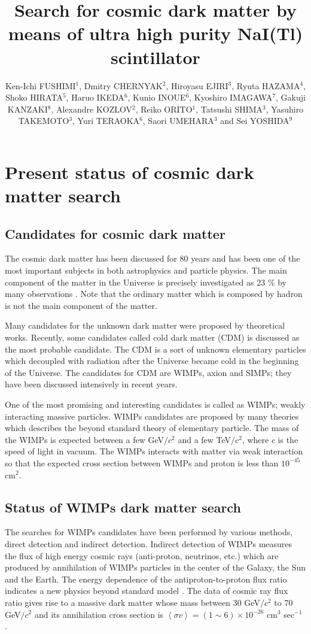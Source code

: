 \documentclass{jpsj-suppl} %
\title{Search for cosmic dark matter by means of ultra high purity NaI(Tl) scintillator}
\author{Ken-Ichi FUSHIMI$^{1}$, Dmitry CHERNYAK$^{2}$, Hiroyasu EJIRI$^{3}$, Ryuta HAZAMA$^{4}$,
Shoko HIRATA$^{5}$, Haruo IKEDA$^{6}$, Kunio INOUE$^{6}$, Kyoshiro IMAGAWA$^{7}$,
Gakuji KANZAKI$^{8}$, Alexandre KOZLOV$^{2}$, Reiko ORITO$^{1}$, 
Tatsushi SHIMA$^{3}$, Yasuhiro TAKEMOTO$^{3}$, Yuri TERAOKA$^{6}$,
Saori UMEHARA$^{3}$ and Sei YOSHIDA$^{9}$}
\begin{document}
\maketitle

\section{Present status of cosmic dark matter search}
\subsection{Candidates for cosmic dark matter}
The cosmic dark matter has been discussed for 80 years \cite{Zwicky}
and has been one of the most important subjects in both astrophysics and particle physics.
The main component of the matter in the Universe is precisely investigated as 23 \% by 
many observations \cite{Planck, WMAP}.
Note that the ordinary matter which is composed by hadron is not the main component of the 
matter.

Many candidates for the unknown dark matter were proposed by theoretical works.
Recently, some candidates called cold dark matter (CDM) is discussed as the most probable 
candidate.
The CDM is a sort of unknown elementary particles which decoupled with radiation after the
Universe became cold in the beginning of the Universe.
The candidates for CDM are WIMPs, axion and SIMPs; they have been discussed intensively 
in recent years.

One of the most promising and interesting candidates is called as WIMPs; 
weakly interacting massive particles.
WIMPs candidates are proposed by many theories which describes the beyond standard theory 
of elementary particle.
The mass of the WIMPs is expected between a few GeV$/c^{2}$ and a few TeV$/c^{2}$, 
where $c$ is the speed of light in vacuum.
The WIMPs interacts with matter via weak interaction so that the expected cross section 
between WIMPs and proton is less than $10^{-45}$ cm$^{2}$.




\subsection{Status of WIMPs dark matter search}
The searches for WIMPs candidates have been performed by various methods, direct detection and 
indirect detection.
Indirect detection of WIMPs measures the flux of high energy
cosmic rays (anti-proton, neutrinos, etc.)
which are produced by annihilation of WIMPs particles in the center of the Galaxy, the Sun and
the Earth.
The energy dependence of the antiproton-to-proton flux ratio indicates a new physics beyond 
standard model \cite{AMS-02}.
The data of cosmic ray flux ratio gives rise to a massive dark matter whose mass between 
30 GeV$/c^{2}$ to 70 GeV$/c^{2}$ and its annihilation cross section is 
$\left<\sigma v\right> = (1\sim6)\times 10^{-26}$ cm$^{3}$ sec$^{-1}$ \cite{AMS-02_DM}.
\end{document}
